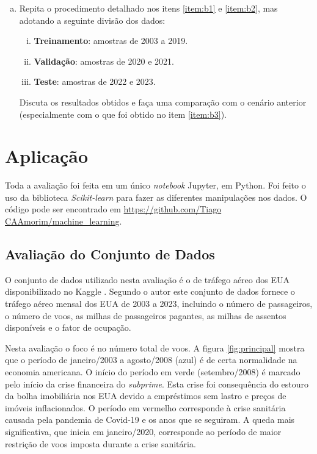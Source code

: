 \documentclass[final,5p]{elsarticle}
\numberwithin{equation}{section}
\begin{document}
\begin{enumerate}[(a)]
        \item Repita o procedimento detalhado nos itens \ref{item:b1} e \ref{item:b2}, mas adotando a seguinte divisão dos dados:

        \begin{enumerate}[(i)]
            \item \textbf{Treinamento}: amostras de 2003 a 2019.
            \item \textbf{Validação}: amostras de 2020 e 2021.
            \item \textbf{Teste}: amostras de 2022 e 2023.
        \end{enumerate}

        Discuta os resultados obtidos e faça uma comparação com o cenário anterior (especialmente
        com o que foi obtido no item \ref{item:b3}).
    \end{enumerate}

\section{Aplicação}

    Toda a avaliação foi feita em um único \emph{notebook} Jupyter, em Python. Foi feito o uso da biblioteca \emph{Scikit-learn} \cite{scikit-learn} para fazer as diferentes manipulações nos dados. O código pode ser encontrado em \href{https://github.com/TiagoCAAmorim/machine_learning/blob/main/Lista01/Lista01.ipynb}{https://github.com/Tiago CAAmorim/machine\_learning}.

    \subsection{Avaliação do Conjunto de Dados}

    O conjunto de dados utilizado nesta avaliação é o de tráfego aéreo dos EUA disponibilizado no Kaggle \cite{YYXian_2024}. Segundo o autor este conjunto de dados fornece o tráfego aéreo mensal dos EUA de 2003 a 2023, incluindo o número de passageiros, o número de voos, as milhas de passageiros pagantes, as milhas de assentos disponíveis e o fator de ocupação.

    Nesta avaliação o foco é no número total de voos. A figura \ref{fig:principal} mostra que o período de janeiro/2003 a agosto/2008 (azul) é de certa normalidade na economia americana. O início do período em verde (setembro/2008) é marcado pelo início da crise financeira do \emph{subprime}. Esta crise foi consequência do estouro da bolha imobiliária nos EUA devido a empréstimos sem lastro e preços de imóveis inflacionados. O período em vermelho corresponde à crise sanitária causada pela pandemia de Covid-19 e os anos que se seguiram. A queda mais significativa, que inicia em janeiro/2020, corresponde ao período de maior restrição de voos imposta durante a crise sanitária.
\end{document}
